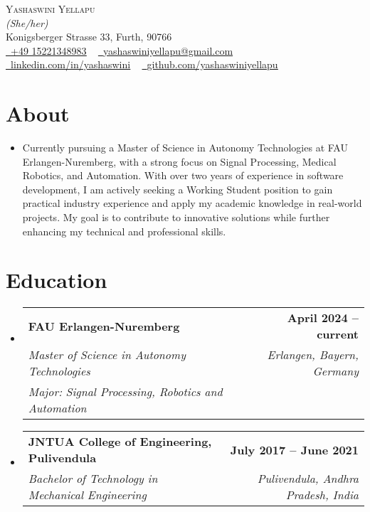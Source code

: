 \documentclass[letterpaper,11pt]{article}
\makeatletter
\newcommand{\resumeItem}[1]{
  \item\small{
    {#1 \vspace{-2pt}}
  }
}
\newcommand{\resumeSubheading}[4]{
  \vspace{-2pt}\item
    \begin{tabular*}{1.0\textwidth}[t]{l@{\extracolsep{\fill}}r}
      \textbf{#1} & \textbf{\small #2} \\
      \textit{\small#3} & \textit{\small #4} \\
    \end{tabular*}\vspace{-7pt}
}
\newcommand{\education}[6]{
  \vspace{-2pt}\item
    \begin{tabular*}{1.0\textwidth}[t]{l@{\extracolsep{\fill}}r}
      \textbf{#1} & \textbf{\small #2} \\
      \textit{\small#3} & \textit{\small#4} \\
      \textit{\small#5} \textit{\small#6}
    \end{tabular*}\vspace{-7pt}
}
\newcommand{\resumeSubHeadingListStart}{\begin{itemize}[leftmargin=0.0in, label={}]}
\newcommand{\resumeSubHeadingListEnd}{\end{itemize}}
\makeatother
\begin{document}
\begin{center}
  {\Huge \scshape Yashaswini Yellapu} \\ \vspace{1pt}
  \textit{\small (She/her)} \\
  Konigsberger Strasse 33, Furth, 90766 \\ \vspace{1pt}
  \small \href{tel:+49 15221348983}{\raisebox{-0.1\height}\faPhone\ \underline{{+49 15221348983}}} ~
  \href{mailto:yashaswiniyellapu@gmail.com}{\raisebox{-0.2\height}\faEnvelope\  \underline{yashaswiniyellapu@gmail.com}} ~
  \href{https://www.linkedin.com/in/yashaswini-y-200500149/}{\raisebox{-0.2\height}\faLinkedin\ \underline{linkedin.com/in/yashaswini}}  ~
  \href{https://github.com/yashaswiniyellapu}{\raisebox{-0.2\height}\faGithub\ \underline{github.com/yashaswiniyellapu}}
  \vspace{-8pt}
\end{center}

\section{About}
\begin{justify}
  \resumeSubHeadingListStart
  \resumeItem{Currently pursuing a Master of Science in Autonomy Technologies at FAU Erlangen-Nuremberg, with a strong focus on Signal Processing, Medical Robotics, and Automation. With over two years of experience in software development, I am actively seeking a Working Student position to gain practical industry experience and apply my academic knowledge in real-world projects. My goal is to contribute to innovative solutions while further enhancing my technical and professional skills.}
  \resumeSubHeadingListEnd
\end{justify}

\vspace{-16pt}

\section{Education}
\resumeSubHeadingListStart
\education
{FAU Erlangen-Nuremberg}{April 2024 -- current}
{Master of Science in Autonomy Technologies}{Erlangen, Bayern, Germany}
{Major:} {Signal Processing, Robotics and Automation}
\resumeSubheading
{JNTUA College of Engineering, Pulivendula}{July 2017 -- June 2021}
{Bachelor of Technology in Mechanical Engineering}{Pulivendula, Andhra Pradesh, India}
\resumeSubHeadingListEnd
\end{document}
